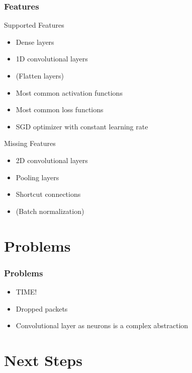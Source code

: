 \documentclass[xcolor=x11names,compress,usenames,dvipsnames,mathsans]{beamer}
\begin{document}
\begin{frame}[fragile]
  \frametitle{Features}

  \begin{minipage}[t]{.48\textwidth}
    Supported Features
    \begin{itemize}
      \item Dense layers
      \item 1D convolutional layers
      \item (Flatten layers)
      \item Most common activation functions
      \item Most common loss functions
      \item SGD optimizer with constant learning rate
    \end{itemize}
  \end{minipage}
  \pause
  \begin{minipage}[t]{.48\textwidth}
    Missing Features
    \begin{itemize}
      \item 2D convolutional layers
      \item Pooling layers
      \item Shortcut connections \citep{he_et_al_2015}
      \item (Batch normalization)
    \end{itemize}
  \end{minipage}
\end{frame}

\section{Problems}

\begin{frame}[fragile]
  \frametitle{Problems}

  \begin{itemize}[<+->]
    \item TIME!
    \item Dropped packets
    \item Convolutional layer as neurons is a complex abstraction
  \end{itemize}
\end{frame}

\section{Next Steps}
\end{document}
